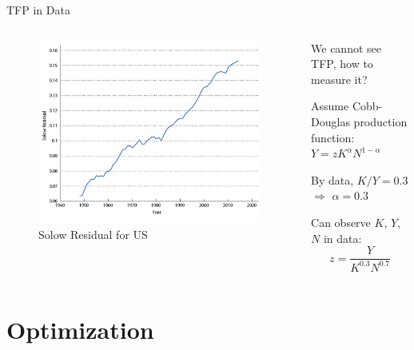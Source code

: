 \documentclass[11pt,aspectratio=169,usenames,dvipsnames]{beamer}
\let\tempone\itemize
\let\temptwo\enditemize
\renewenvironment{itemize}{\tempone\addtolength{\itemsep}{\fill}}{\temptwo}
\begin{document}
\begin{frame}{TFP in Data}
\label{slide:TFP_in_Data}
    \begin{columns}
        \begin{column}{0.6\textwidth}
            \begin{figure}
                \caption{\alert{Solow Residual} for US}
                \includegraphics[width=.9\textwidth]{./figures/Figure4_18.jpg}
            \end{figure}
        \end{column}
        \begin{column}{0.4\textwidth}
            We cannot see TFP, \alert{how to measure it}?
            \begin{itemize}
                \item Assume Cobb-Douglas production function: $ Y = z K^{\alpha} N^{1-\alpha} $
                \item By data, $ K/Y = 0.3 $ $ \Rightarrow  $ $ \alpha = 0.3  $
                \item Can observe $ K $, $ Y $, $ N $ in data:
                \begin{equation*}
                   z = \frac{Y}{K^{0.3}N^{0.7}}
                \end{equation*}
            \end{itemize}
        \end{column}
    \end{columns}
\end{frame}

\section{Optimization}
\label{sec:Optimization}
\end{document}
